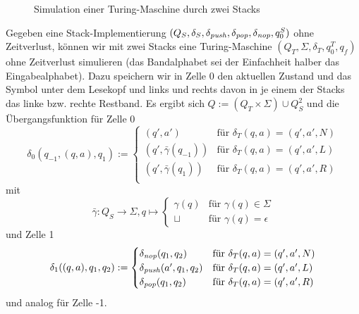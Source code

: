 \documentclass{article}
\begin{document}
\begin{beispiel}
    \begin{figure}[h]
        \centering
        \caption{Simulation einer Turing-Maschine durch zwei Stacks}
    \end{figure}
    Gegeben eine Stack-Implementierung $(Q_S, \delta_S, \delta_{\mathit{push}}, \delta_{\mathit{pop}}, \delta_{\mathit{nop}}, q^S_0)$ ohne Zeitverlust, können wir mit zwei Stacks eine Turing-Maschine $(Q_T, \Sigma, \delta_T, q^T_0, q_f)$ ohne Zeitverlust simulieren (das Bandalphabet sei der Einfachheit halber das Eingabealphabet). Dazu speichern wir in Zelle 0  den aktuellen Zustand und das Symbol unter dem Lesekopf und links und rechts davon in je einem der Stacks das linke bzw. rechte Restband. Es ergibt sich $Q := (Q_T \times \Sigma) \cup Q^2_S$ und die Übergangsfunktion für Zelle 0
    \[ \delta_0(q_{-1}, (q, a), q_1) :=
    \begin{cases}
        (q', a') &\text{für } \delta_T(q, a) = (q', a', N) \\
        (q', \bar\gamma(q_{-1})) &\text{für } \delta_T(q, a) = (q', a', L) \\
        (q', \bar\gamma(q_1)) &\text{für } \delta_T(q, a) = (q', a', R) \\
    \end{cases} \]
mit
\[ \bar\gamma : Q_S \rightarrow \Sigma, q \mapsto \begin{cases}
        \gamma(q) &\text{für } \gamma(q) \in \Sigma \\
        \sqcup &\text{für } \gamma(q) = \epsilon
    \end{cases} \]
und Zelle 1
    \[ \delta_1((q, a), q_1, q_2) :=
    \begin{cases}
        \delta_{\mathit{nop}}(q_1, q_2) &\text{für } \delta_T(q, a) = (q', a', N) \\
        \delta_{\mathit{push}}(a', q_1, q_2) &\text{für } \delta_T(q, a) = (q', a', L) \\
        \delta_{\mathit{pop}}(q_1, q_2) &\text{für } \delta_T(q, a) = (q', a', R) \\
    \end{cases} \]
und analog für Zelle -1.
\end{beispiel}
\end{document}
